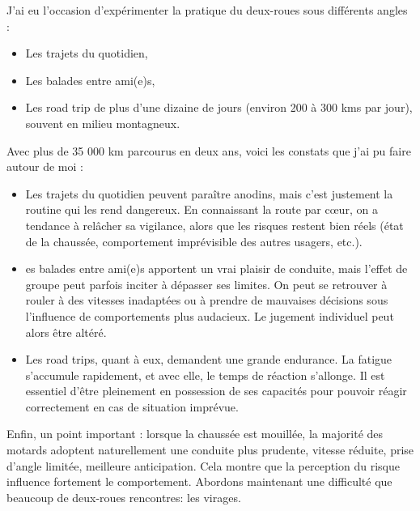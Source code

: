 J’ai eu l’occasion d’expérimenter la pratique du deux-roues sous différents angles :\
\begin{itemize}
    \item Les trajets du quotidien,
    \item Les balades entre ami(e)s,
    \item Les road trip de plus d'une dizaine de jours (environ 200 à 300 kms par jour), souvent en milieu montagneux.
\end{itemize}
Avec plus de 35 000 km parcourus en deux ans, voici les constats que j’ai pu faire autour de moi :
\begin{itemize}
  \item Les trajets du quotidien peuvent paraître anodins, mais c’est justement la routine qui les rend dangereux. En connaissant la route par cœur, on a tendance à relâcher sa vigilance, alors que les risques restent bien réels (état de la chaussée, comportement imprévisible des autres usagers, etc.).
  \item es balades entre ami(e)s apportent un vrai plaisir de conduite, mais l’effet de groupe peut parfois inciter à dépasser ses limites. On peut se retrouver à rouler à des vitesses inadaptées ou à prendre de mauvaises décisions sous l’influence de comportements plus audacieux. Le jugement individuel peut alors être altéré.
  \item 	Les road trips, quant à eux, demandent une grande endurance. La fatigue s’accumule rapidement, et avec elle, le temps de réaction s’allonge. Il est essentiel d’être pleinement en possession de ses capacités pour pouvoir réagir correctement en cas de situation imprévue.
\end{itemize}
Enfin, un point important : lorsque la chaussée est mouillée, la majorité des motards adoptent naturellement une conduite plus prudente, vitesse réduite, prise d’angle limitée, meilleure anticipation. Cela montre que la perception du risque influence fortement le comportement. %
Abordons maintenant une difficulté que beaucoup de deux-roues rencontres: les virages.

